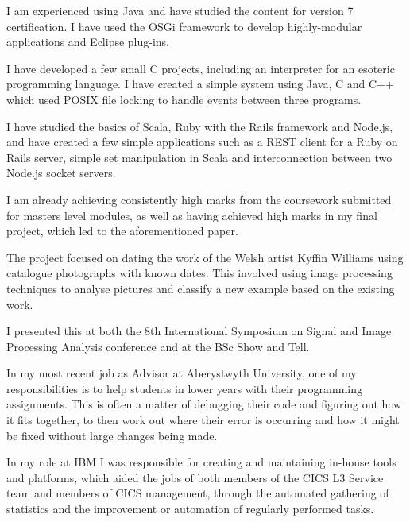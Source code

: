 \documentclass[10pt,stdletter,dateno,sigleft]{newlfm} %
\begin{document}
\begin{newlfm}
I am experienced using Java and have studied the content for version 7 
certification. I have used the OSGi framework to develop highly-modular
applications and Eclipse plug-ins.

I have developed a few small C projects, including an interpreter for an 
esoteric programming language. I have created a simple system using Java, C and
C++ which used POSIX file locking to handle events between three programs.

I have studied the basics of Scala, Ruby with the Rails framework and Node.js,
and have created a few simple applications such as a REST client for a Ruby on
Rails server, simple set manipulation in Scala and interconnection between two
Node.js socket servers.

I am already achieving consistently high marks from the coursework submitted 
for masters level modules, as well as having achieved high marks in my final
project, which led to the aforementioned paper.

The project focused on dating the work of the Welsh artist Kyffin Williams 
using catalogue photographs with known dates. This involved using image 
processing techniques to analyse pictures and classify a new example based
on the existing work.

I presented this at both the 8th International Symposium on Signal and Image Processing Analysis conference and at the BSc Show and Tell.

In my most recent job as Advisor at Aberystwyth University, one of my 
responsibilities is to help students in lower years with their programming 
assignments. This is often a matter of debugging their code and 
figuring out how it fits together, to then work out where their error is
occurring and how it might be fixed without large changes being made.

In my role at IBM I was responsible for creating and maintaining in-house tools and 
platforms, which aided the jobs of both members of the CICS L3 Service team and members
of CICS management, through the automated gathering of statistics and the 
improvement or automation of regularly performed tasks.


\end{newlfm}
\end{document}
